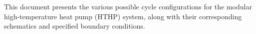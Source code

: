 This document presents the various possible cycle 
configurations for the modular high-temperature heat pump (HTHP) system, 
along with their corresponding schematics and specified boundary conditions.

